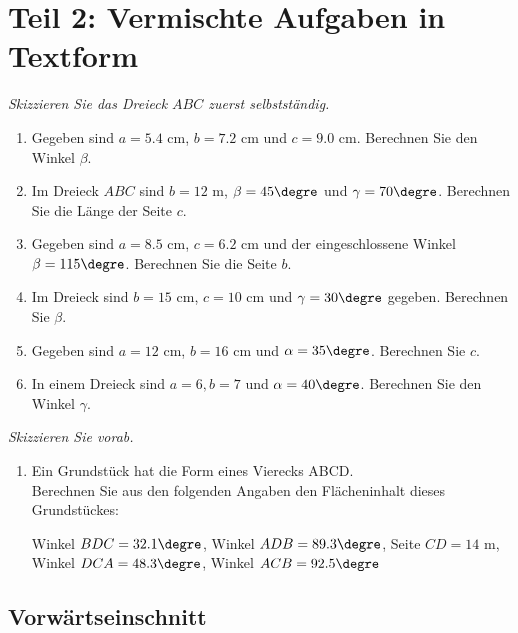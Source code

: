 \vspace{1cm}

\TNTeop{}



\section*{Teil 2: Vermischte Aufgaben in Textform}
\textit{Skizzieren Sie das Dreieck $ABC$ zuerst selbstständig.}

\begin{enumerate}[resume=aufgaben]
    \item Gegeben sind $a = 5.4$ cm, $b = 7.2$ cm und $c = 9.0$ cm. Berechnen Sie den Winkel $\beta$.
    \item Im Dreieck $ABC$ sind $b = 12$ m, $\beta = 45\degre$ und $\gamma = 70\degre$. Berechnen Sie die Länge der Seite $c$.
    \item Gegeben sind $a = 8.5$ cm, $c = 6.2$ cm und der eingeschlossene Winkel $\beta = 115\degre$. Berechnen Sie die Seite $b$.
    \item Im Dreieck sind $b = 15$ cm, $c = 10$ cm und $\gamma = 30\degre$ gegeben. Berechnen Sie $\beta$.
    \item Gegeben sind $a = 12$ cm, $b = 16$ cm und $\alpha = 35\degre$. Berechnen Sie $c$.
    \item In einem Dreieck sind $a=6, b=7$ und $\alpha=40\degre$. Berechnen Sie den Winkel $\gamma$.
\end{enumerate}

\TNTeop{}

\newpage

\textit{Skizzieren Sie vorab.}

\begin{enumerate}[resume=aufgaben]
    \item Ein Grundstück hat die Form eines Vierecks ABCD.\\
    Berechnen Sie aus den folgenden Angaben den Flächeninhalt dieses
    Grundstückes:

Winkel $BDC = 32.1\degre$, Winkel $ADB = 89.3\degre$, Seite $CD=14$ m,
Winkel $DCA=48.3\degre$, Winkel $ACB = 92.5\degre$

\end{enumerate}

\TNTeop{}
\subsection*{Vorwärtseinschnitt}

